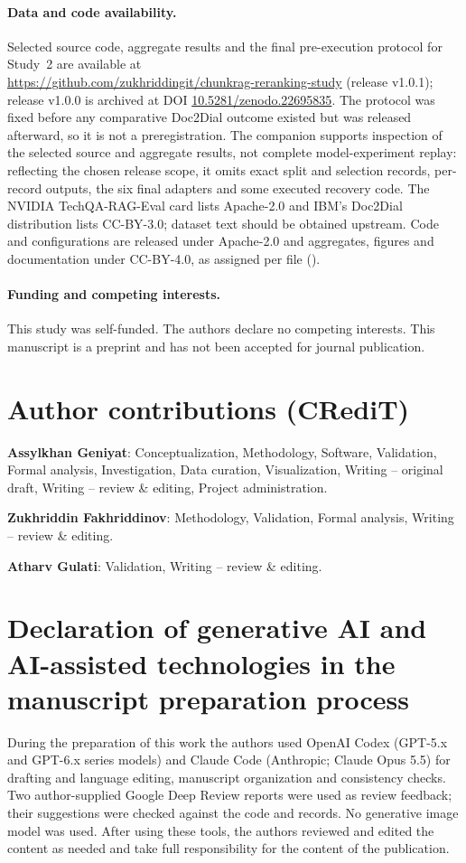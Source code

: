 \paragraph{Data and code availability.} Selected source code, aggregate results and the final pre-execution protocol for Study~2 are available at\\\url{https://github.com/zukhriddingit/chunkrag-reranking-study} (release v1.0.1);\\release v1.0.0 is archived at DOI \href{https://doi.org/10.5281/zenodo.22695835}{\mbox{10.5281/zenodo.22695835}}. The protocol was fixed before any comparative Doc2Dial outcome existed but was released afterward, so it is not a preregistration. The companion supports inspection of the selected source and aggregate results, not complete model-experiment replay: reflecting the chosen release scope, it omits exact split and selection records, per-record outputs, the six final adapters and some executed recovery code. The NVIDIA TechQA-RAG-Eval card lists Apache-2.0 and IBM's Doc2Dial distribution lists CC-BY-3.0; dataset text should be obtained upstream. Code and configurations are released under Apache-2.0 and aggregates, figures and documentation under CC-BY-4.0, as assigned per file ().
\paragraph{Funding and competing interests.} This study was self-funded. The authors declare no competing interests. This manuscript is a preprint and has not been accepted for journal publication.
\section*{Author contributions (CRediT)}
\noindent\textbf{Assylkhan Geniyat}: Conceptualization, Methodology, Software, Validation, Formal analysis, Investigation, Data curation, Visualization, Writing -- original draft, Writing -- review \& editing, Project administration.

\noindent\textbf{Zukhriddin Fakhriddinov}: Methodology, Validation, Formal analysis, Writing -- review \& editing.

\noindent\textbf{Atharv Gulati}: Validation, Writing -- review \& editing.

\section*{Declaration of generative AI and AI-assisted technologies in the manuscript preparation process}
During the preparation of this work the authors used OpenAI Codex (GPT-5.x and GPT-6.x series models) and Claude Code (Anthropic; Claude Opus 5.5) for drafting and language editing, manuscript organization and consistency checks. Two author-supplied Google Deep Review reports were used as review feedback; their suggestions were checked against the code and records. No generative image model was used. After using these tools, the authors reviewed and edited the content as needed and take full responsibility for the content of the publication.
